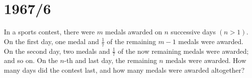 \documentclass[12pt]{article}
\begin{document}
\section*{1967/6}
In a sports contest, there were $m$ medals awarded on $n$ successive days $(n > 1)$. On the first day, one medal and $\frac{1}{7}$ of the remaining $m-1$ medals were awarded. On the second day, two medals and $\frac{1}{7}$ of the now remaining medals were awarded; and so on. On the $n$-th and last day, the remaining $n$ medals were awarded. How many days did the contest last, and how many medals were awarded altogether?
\end{document}
